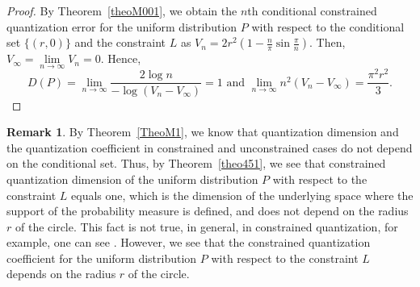 \documentclass[12pt, reqno]{amsart}
\theoremstyle{plain}
\theoremstyle{definition}
\newtheorem{remark1}[subsubsection]{Remark}
\newcommand{\set}[1]{\{#1\}}%
\newcommand{\te}{\text}%
\begin{document}
\begin{proof}
By Theorem~\ref{theoM001}, we obtain the $n$th conditional constrained quantization error for the uniform distribution $P$ with respect to the conditional set $\set{(r, 0)}$ and the constraint $L$ as 
$V_n=2r^2(1-\frac n \pi\sin \frac \pi n).$
Then, $V_\infty=\mathop{\lim}\limits_{n\to\infty} V_n=0$. 
Hence, 
\[D(P)=\lim_{n\to \infty} \frac{2\log n}{-\log (V_n-V_\infty)}=1 \te{ and } \lim\limits_{n\to \infty} n^2 (V_n-V_\infty)=\frac{\pi ^2 r^2}{3}.\]
\end{proof} 
\begin{remark1}\label{rem5} 
By Theorem~\ref{TheoM1}, we know that quantization dimension and the quantization coefficient in constrained and unconstrained cases do not depend on the conditional set. Thus, 
by Theorem~\ref{theo451}, we see that constrained quantization dimension of the uniform distribution $P$ with respect to the constraint $L$ equals one, which is the dimension of the underlying space where the support of the probability measure is defined, and does not depend on the radius $r$ of the circle. This fact is not true, in general, in constrained quantization, for example, one can see \cite{PR3, PR1}. However, we see that the constrained quantization coefficient for the uniform distribution $P$ with respect to the constraint $L$ depends on the radius $r$ of the circle. 
\end{remark1} 
 
\end{document}
